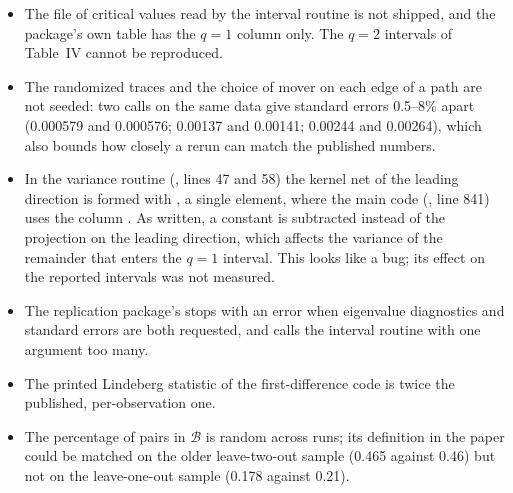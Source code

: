 \begin{itemize}
\item The file of critical values read by the interval routine is not shipped, and the package's own table has
the $q=1$ column only. The $q=2$ intervals of Table~IV cannot be reproduced.
\item The randomized traces and the choice of mover on each edge of a path are not seeded: two calls on the
same data give standard errors 0.5--8\% apart (0.000579 and 0.000576; 0.00137 and 0.00141; 0.00244 and
0.00264), which also bounds how closely a rerun can match the published numbers.
\item In the variance routine (, lines 47 and 58) the kernel net of the leading direction is
formed with , a single element, where the main code (, line 841) uses
the column . As written, a constant is subtracted instead of the projection on the leading
direction, which affects the variance of the remainder that enters the $q=1$ interval. This looks like a bug; its
effect on the reported intervals was not measured.
\item The replication package's  stops with an error when eigenvalue diagnostics
and standard errors are both requested, and calls the interval routine with one argument too many.
\item The printed Lindeberg statistic of the first-difference code is twice the published, per-observation one.
\item The percentage of pairs in $\mathcal B$ is random across runs; its definition in the paper could be
matched on the older leave-two-out sample (0.465 against 0.46) but not on the leave-one-out sample (0.178
against 0.21).
\end{itemize}
